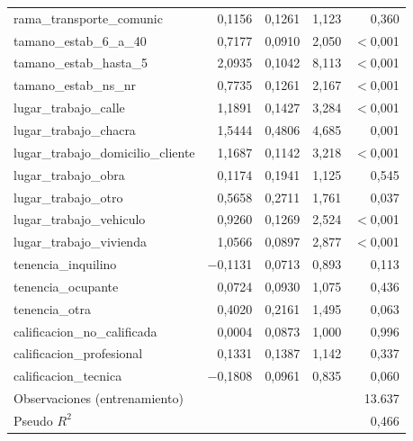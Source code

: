 \begin{longtable}{lrrrr}
rama\_transporte\_comunic & 0,1156 & 0,1261 & 1,123 & 0,360 \\
tamano\_estab\_6\_a\_40 & 0,7177 & 0,0910 & 2,050 & $<$0,001 \\
tamano\_estab\_hasta\_5 & 2,0935 & 0,1042 & 8,113 & $<$0,001 \\
tamano\_estab\_ns\_nr & 0,7735 & 0,1261 & 2,167 & $<$0,001 \\
lugar\_trabajo\_calle & 1,1891 & 0,1427 & 3,284 & $<$0,001 \\
lugar\_trabajo\_chacra & 1,5444 & 0,4806 & 4,685 & 0,001 \\
lugar\_trabajo\_domicilio\_cliente & 1,1687 & 0,1142 & 3,218 & $<$0,001 \\
lugar\_trabajo\_obra & 0,1174 & 0,1941 & 1,125 & 0,545 \\
lugar\_trabajo\_otro & 0,5658 & 0,2711 & 1,761 & 0,037 \\
lugar\_trabajo\_vehiculo & 0,9260 & 0,1269 & 2,524 & $<$0,001 \\
lugar\_trabajo\_vivienda & 1,0566 & 0,0897 & 2,877 & $<$0,001 \\
tenencia\_inquilino & $-$0,1131 & 0,0713 & 0,893 & 0,113 \\
tenencia\_ocupante & 0,0724 & 0,0930 & 1,075 & 0,436 \\
tenencia\_otra & 0,4020 & 0,2161 & 1,495 & 0,063 \\
calificacion\_no\_calificada & 0,0004 & 0,0873 & 1,000 & 0,996 \\
calificacion\_profesional & 0,1331 & 0,1387 & 1,142 & 0,337 \\
calificacion\_tecnica & $-$0,1808 & 0,0961 & 0,835 & 0,060 \\
\midrule
Observaciones (entrenamiento) & \multicolumn{4}{r}{13.637} \\
Pseudo $R^2$ & \multicolumn{4}{r}{0,466} \\
\bottomrule
\end{longtable}